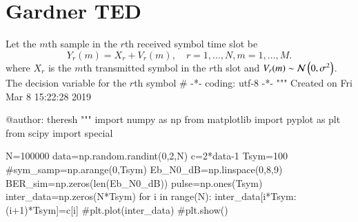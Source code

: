 \documentclass[journal,12pt,twocolumn]{IEEEtran}
\begin{document}
\section{Gardner TED}
%
Let the $m$th sample in the $r$th received symbol time slot be
\begin{equation}
Y_r(m)= X_r + V_r(m), \quad r = 1,\dots,N, m = 1 ,\dots,M.
\end{equation} 
where $X_r$ is the $m$th transmitted symbol in the $r$th slot and $V_r(m) \sim \mathcal{N}\left(0,\sigma^2\right) $. 
The decision variable for the $r$th symbol # -*- coding: utf-8 -*-
"""
Created on Fri Mar  8 15:22:28 2019

@author: theresh
"""
import numpy as np
from matplotlib import pyplot as plt
from scipy import special

N=100000
data=np.random.randint(0,2,N)
c=2*data-1
Tsym=100
#sym_samp=np.arange(0,Tsym)
Eb_N0_dB=np.linspace(0,8,9)
BER_sim=np.zeros(len(Eb_N0_dB))
pulse=np.ones(Tsym)
inter_data=np.zeros(N*Tsym)
for i in range(N):
    inter_data[i*Tsym:(i+1)*Tsym]=c[i]
#plt.plot(inter_data)
#plt.show()
\end{document}
